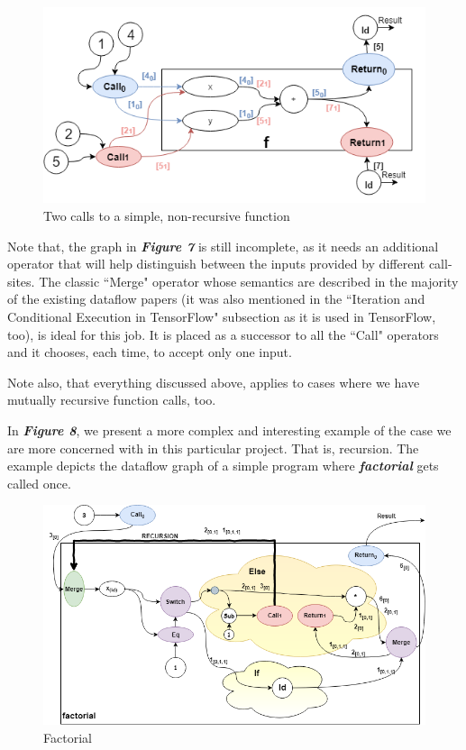 \documentclass[ack,preface]{dithesis}
\begin{document}
\begin{figure}
\centering
\includegraphics[scale=0.7]{figures/Example2}
\caption{Two calls to a simple, non-recursive function}
\end{figure}

Note that, the  graph in \textit{\textbf{Figure 7}} is still incomplete, as it needs an additional operator that will help distinguish between the inputs provided by different call-sites. The classic ``Merge" operator whose semantics are described in the majority of  the existing dataflow papers (it was also mentioned in the ``Iteration and Conditional Execution in TensorFlow" subsection as it is used in TensorFlow, too), is ideal for this job. It is placed as a successor to all the ``Call" operators and it chooses, each time, to accept only one input.

Note also, that everything discussed above, applies to cases where we have mutually recursive function calls, too. 

In  \textit{\textbf{Figure 8}}, we present a more complex and interesting example of the case we are more concerned with in this particular project. That is, recursion. The example depicts the dataflow graph of a simple program where  \textit{\textbf{factorial}} gets called once.

\begin{figure}[h]
\centering
\includegraphics[scale=0.63]{figures/factorial}
\caption{Factorial}
\end{figure}
\end{document}
